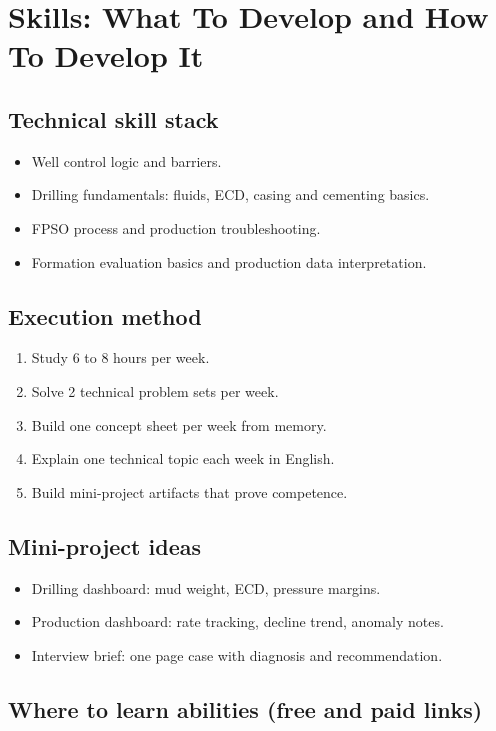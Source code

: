 \documentclass[11pt,openany]{book}
\begin{document}
\chapter{Skills: What To Develop and How To Develop It}

\section{Technical skill stack}
\begin{itemize}
  \item Well control logic and barriers.
  \item Drilling fundamentals: fluids, ECD, casing and cementing basics.
  \item FPSO process and production troubleshooting.
  \item Formation evaluation basics and production data interpretation.
\end{itemize}

\section{Execution method}
\begin{enumerate}
  \item Study 6 to 8 hours per week.
  \item Solve 2 technical problem sets per week.
  \item Build one concept sheet per week from memory.
  \item Explain one technical topic each week in English.
  \item Build mini-project artifacts that prove competence.
\end{enumerate}

\section{Mini-project ideas}
\begin{itemize}
  \item Drilling dashboard: mud weight, ECD, pressure margins.
  \item Production dashboard: rate tracking, decline trend, anomaly notes.
  \item Interview brief: one page case with diagnosis and recommendation.
\end{itemize}

\section{Where to learn abilities (free and paid links)}
\end{document}
